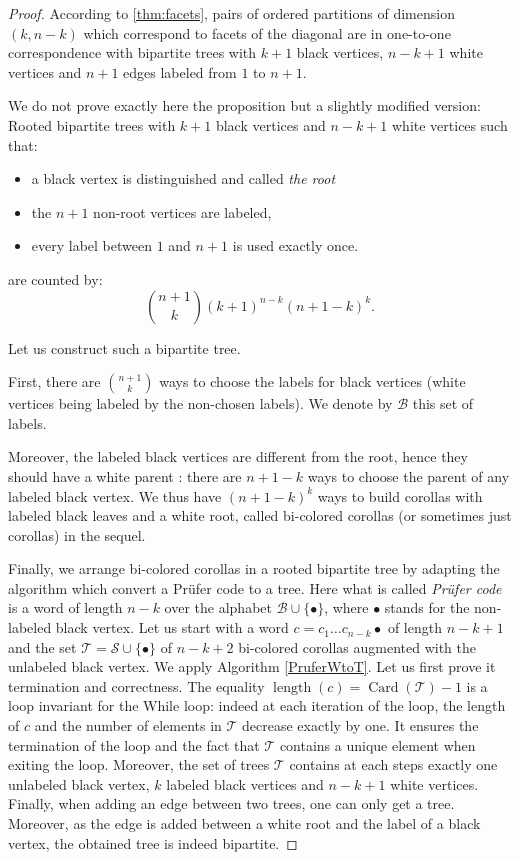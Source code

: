 \begin{proof}
According to \cref{thm:facets}, pairs of ordered partitions of dimension $(k,n-k)$ which correspond to facets of the diagonal are in one-to-one correspondence with bipartite trees with $k+1$ black vertices, $n-k+1$ white vertices and $n+1$ edges labeled from $1$ to $n+1$.

We do not prove exactly here the proposition but a slightly modified version: 
Rooted bipartite trees with $k+1$ black vertices and $n-k+1$ white vertices such that:
\begin{itemize}
\item a black vertex is distinguished and called \emph{the root}
\item the $n+1$ non-root vertices are labeled,
\item every label between $1$ and $n+1$ is used exactly once.
\end{itemize}
are counted by:
\begin{equation}
\binom{n+1}{k}(k+1)^{n-k}(n+1-k)^{k}.
\end{equation}

Let us construct such a bipartite tree. 

First, there are $\binom{n+1}{k}$ ways to  choose the labels for black vertices (white vertices being labeled by the non-chosen labels). 
We denote by $\mathcal{B}$ this set of labels.

Moreover, the labeled black vertices are different from the root, hence they should have a white parent : there are $n+1-k$ ways to choose the parent of any labeled black vertex. 
We thus have  $(n+1-k)^{k}$ ways to build corollas with labeled black leaves and a white root, called bi-colored corollas (or sometimes just corollas) in the sequel.

Finally, we arrange bi-colored corollas in a rooted bipartite tree by adapting the algorithm which convert a Pr\"ufer code to a tree. 
Here what is called \emph{Pr\"ufer code} is a word of length $n-k$ over the alphabet $\mathcal{B} \cup \{\bullet\}$, where $\bullet$ stands for the non-labeled black vertex. 
Let us start with a word $c=c_1 \ldots c_{n-k} \bullet$ of length $n-k+1$ and the set $\mathcal{T}=\mathcal{S} \cup \{\bullet\}$ of $n-k+2$ bi-colored corollas augmented with the unlabeled black vertex. 
We apply Algorithm \ref{PruferWtoT}. Let us first prove it termination and correctness. The equality 
$\operatorname{length}(c)=\operatorname{Card}(\mathcal{T})-1$ is a loop invariant for the While loop: indeed at each iteration of the loop, the length of $c$ and the number of elements in $\mathcal{T}$ decrease exactly by one. It ensures the termination of the loop and the fact that $\mathcal{T}$ contains a unique element when exiting the loop. Moreover, the set of trees $\mathcal{T}$ contains at each steps exactly one unlabeled black vertex, $k$ labeled black vertices and $n-k+1$ white vertices. Finally, when adding an edge between two trees, one can only get a tree. Moreover, as the edge is added between a white root and the label of a black vertex, the obtained tree is indeed bipartite.


\end{proof}
